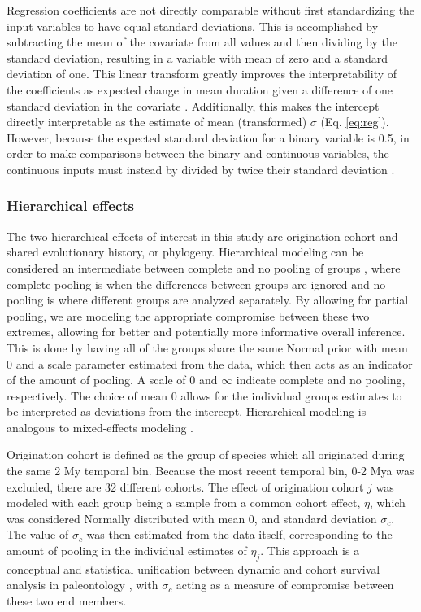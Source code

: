 \documentclass{article}
\begin{document}
Regression coefficients are not directly comparable without first standardizing the input variables to have equal standard deviations. This is accomplished by subtracting the mean of the covariate from all values and then dividing by the standard deviation, resulting in a variable with mean of zero and a standard deviation of one. This linear transform greatly improves the interpretability of the coefficients as expected change in mean duration given a difference of one standard deviation in the covariate \cite{Schielzeth2010}. Additionally, this makes the intercept directly interpretable as the estimate of mean (transformed) \(\sigma\) (Eq. \ref{eq:reg}). However, because the expected standard deviation for a binary variable is 0.5, in order to make comparisons between the binary and continuous variables, the continuous inputs must instead by divided by twice their standard deviation \cite{Gelman2008}. 

\subsubsection{Hierarchical effects}

The two hierarchical effects of interest in this study are origination cohort and shared evolutionary history, or phylogeny. Hierarchical modeling can be considered an intermediate between complete and no pooling of groups \cite{Gelman2007}, where complete pooling is when the differences between groups are ignored and no pooling is where different groups are analyzed separately. By allowing for partial pooling, we are modeling the appropriate compromise between these two extremes, allowing for better and potentially more informative overall inference. This is done by having all of the groups share the same Normal prior with mean 0 and a scale parameter estimated from the data, which then acts as an indicator of the amount of pooling. A scale of 0 and \(\infty\) indicate complete and no pooling, respectively. The choice of mean 0 allows for the individual groups estimates to be interpreted as deviations from the intercept. Hierarchical modeling is analogous to mixed-effects modeling \cite{Gelman2007}.

Origination cohort is defined as the group of species which all originated during the same 2 My temporal bin. Because the most recent temporal bin, 0-2 Mya was excluded, there are 32 different cohorts. The effect of origination cohort \(j\) was modeled with each group being a sample from a common cohort effect, \(\eta\), which was considered Normally distributed with mean 0, and standard deviation \(\sigma_{c}\). The value of \(\sigma_{c}\) was then estimated from the data itself, corresponding to the amount of pooling in the individual estimates of \(\eta_{j}\). This approach is a conceptual and statistical unification between dynamic and cohort survival analysis in paleontology \cite{Foote1988,Raup1978,Raup1975,VanValen1979,Baumiller1993}, with \(\sigma_{c}\) acting as a measure of compromise between these two end members.
\end{document}
